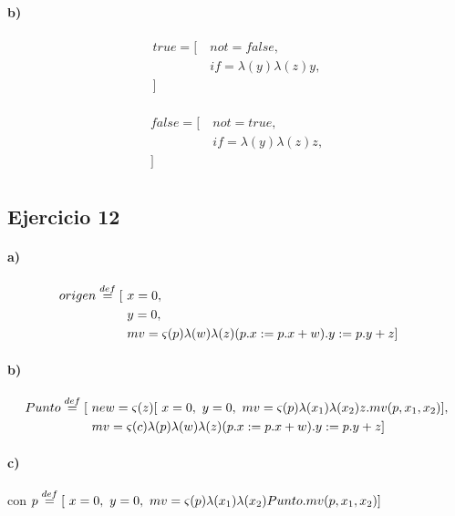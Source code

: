 \documentclass[10pt,a4paper]{article}
\begin{document}
\paragraph{b)}
\begin{multicols}{2}
\begin{align*}
true = [~&not = false,  \\
&if = \lambda(y)\lambda(z)y, \\
]~& \\
\end{align*}

\begin{align*}
false = [~&not = true,  \\
&if = \lambda(y)\lambda(z)z, \\
]~& \\
\end{align*}
\end{multicols}
\setlength{\columnsep}{5mm}
\subsection{Ejercicio 12}
\paragraph{a)}
\begin{align*}
origen \overset{def}{=} [~& x = 0, \\
 & y = 0, \\
 & mv = \varsigma(p)\lambda(w)\lambda(z) (p.x:=p.x+w).y:=p.y+z
 ]~& \\
\end{align*}
\paragraph{b)}
\begin{align*}
Punto \overset{def}{=} [~& new = \varsigma(z)[~x=0,~y = 0,~ mv = \varsigma(p)\lambda(x_1)\lambda(x_2) z.mv(p,x_1,x_2)]
, \\
& mv = \varsigma(c)\lambda(p)\lambda(w)\lambda(z) (p.x:=p.x+w).y:=p.y+z ] \\
\end{align*}

\paragraph{c)}
	\vspace{5mm}
	\begin{center}\small
		\begin{scprooftree}
		\def\extraVskip{5pt}


    \RightLabel{[Sel]}
		\end{scprooftree}    
	\end{center}
	con $p \overset{def}{=} [~x=0,~y = 0,~ mv = \varsigma(p)\lambda(x_1)\lambda(x_2) Punto.mv(p,x_1,x_2)]$
\end{document}
